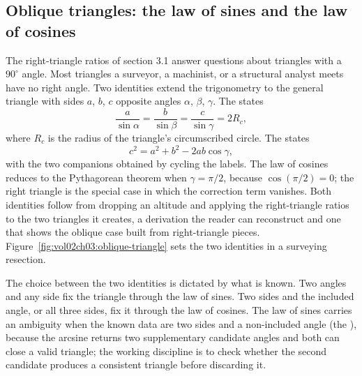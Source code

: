 \subsection{Oblique triangles: the law of sines and the law of cosines}

The right-triangle ratios of section 3.1 answer questions about triangles
with a $90^{\circ}$ angle. Most triangles a surveyor, a machinist, or a
structural analyst meets have no right angle. Two identities extend the
trigonometry to the general triangle with sides $a$, $b$, $c$ opposite
angles $\alpha$, $\beta$, $\gamma$. The  states
\[
\frac{a}{\sin\alpha} = \frac{b}{\sin\beta} = \frac{c}{\sin\gamma} = 2R_{c},
\]
where $R_{c}$ is the radius of the triangle's circumscribed circle. The
 states
\[
c^{2} = a^{2} + b^{2} - 2ab\cos\gamma,
\]
with the two companions obtained by cycling the labels. The law of cosines
reduces to the Pythagorean theorem when $\gamma = \pi/2$, because
$\cos(\pi/2) = 0$; the right triangle is the special case in which the
correction term vanishes. Both identities follow from dropping an altitude
and applying the right-triangle ratios to the two triangles it creates, a
derivation the reader can reconstruct and one that shows the oblique case
built from right-triangle pieces.
Figure~\ref{fig:vol02ch03:oblique-triangle} sets the two identities in a
surveying resection.

The choice between the two identities is dictated by what is known. Two
angles and any side fix the triangle through the law of sines. Two sides and
the included angle, or all three sides, fix it through the law of cosines.
The law of sines carries an ambiguity when the known data are two sides and a
non-included angle (the ), because the arcsine
returns two supplementary candidate angles and both can close a valid
triangle; the working discipline is to check whether the second candidate
produces a consistent triangle before discarding it.


